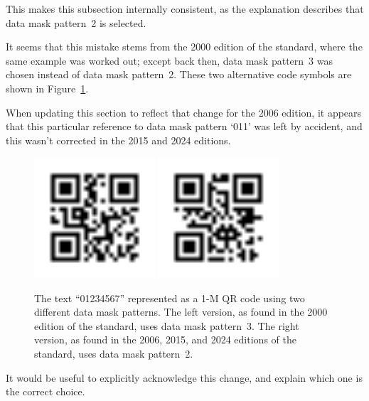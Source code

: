\documentclass[a4paper,twoside]{article}
\begin{document}
This makes this subsection internally consistent, as the explanation describes that data mask pattern~2 is selected.

It seems that this mistake stems from the 2000 edition of the standard, where the same example was worked out;
except back then, data mask pattern~3 was chosen instead of data mask pattern~2.
These two alternative code symbols are shown in Figure~\ref{fig:dmp-changed-2}.

When updating this section to reflect that change for the 2006 edition, it appears that this particular reference
to data mask pattern `011' was left by accident, and this wasn't corrected in the 2015 and 2024 editions.

\begin{figure}[h!]
\centering
\includegraphics[width=0.4\textwidth]{images/qrcode_iso18004_2000_AnnexG_1Mp3.png}
\includegraphics[width=0.4\textwidth]{images/qrcode_iso18004_2006_2015_2024_AnnexI_1Mp2.png}
\caption{The text ``01234567'' represented as a 1-M QR code using two different data mask patterns.
         The left version, as found in the 2000 edition of the standard, uses data mask pattern~3.
         The right version, as found in the 2006, 2015, and 2024 editions of the standard, uses data mask pattern~2.}
\label{fig:dmp-changed-2}
\end{figure}

It would be useful to explicitly acknowledge this change, and explain which one is the correct choice.
\end{document}
